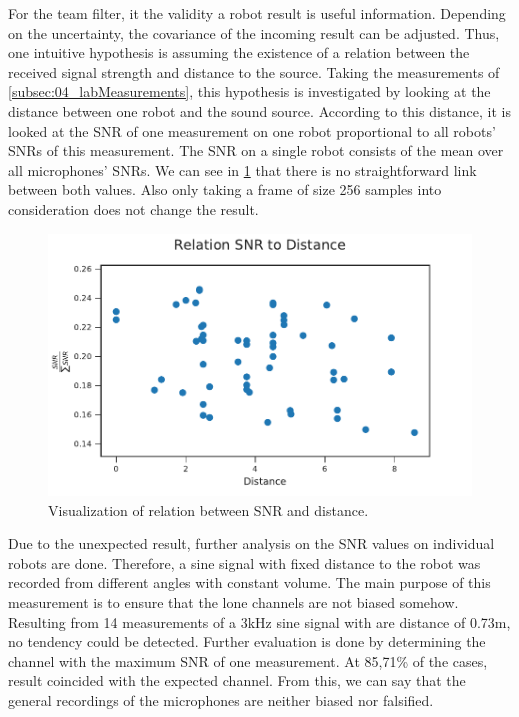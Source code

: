 For the team filter, it the validity a robot result is useful information.
Depending on the uncertainty, the covariance of the incoming result can be adjusted.
Thus, one intuitive hypothesis is assuming the existence of a relation between the
received signal strength and distance to the source.
Taking the measurements of \ref{subsec:04_labMeasurements}, this hypothesis is
investigated by looking at the distance between one robot and the sound source.
According to this distance, it is looked at the \ac{SNR} of one measurement on
one robot proportional to all robots' \acp{SNR} of this measurement.
The \ac{SNR} on a single robot consists of the mean over all microphones' \acp{SNR}.
We can see in \cref{fig:04_snrDistance} that there is no straightforward
link between both values.
Also only taking a frame of size 256 samples into consideration
does not change the result.
\begin{figure}[ht]
	\centering
		\includegraphics[]{figures/evaluation/snr_scatter}
	\caption{Visualization of relation between SNR and distance.}
    \label{fig:04_snrDistance}
\end{figure}

Due to the unexpected result, further analysis on the \ac{SNR} values
on individual robots are done.
Therefore, a sine signal with fixed distance to the robot
was recorded from different angles with constant volume.
The main purpose of this measurement is to ensure that the lone channels
are not biased somehow.
Resulting from 14 measurements of a 3\si{\kilo\hertz} sine signal
with are distance of 0.73\si{m}, no tendency could be detected.
Further evaluation is done by determining the channel with the maximum
\ac{SNR} of one measurement. At 85,71\si{\percent} of the cases,
result coincided with the expected channel.
From this, we can say that the general recordings of the microphones
are neither biased nor falsified.

